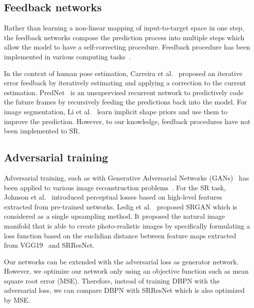 \documentclass[10pt,twocolumn,letterpaper]{article}
\begin{document}
\subsection{Feedback networks} 
Rather than learning a non-linear mapping of input-to-target space in one step, the feedback networks compose the prediction process into multiple steps which allow the model to have a self-correcting procedure. Feedback procedure has been implemented in various computing tasks~\cite{carreira2016human,ross2011learning,tu2010auto,li2016iterative,zamir2016feedback, shrivastava2016contextual,lotter2016deep}.

In the context of human pose estimation, Carreira et
al.~\cite{carreira2016human} proposed an iterative error feedback by
iteratively estimating and applying a correction to the current
estimation. PredNet~\cite{lotter2016deep} is an unsupervised recurrent
network to predictively code the future frames by recursively feeding
the predictions back into the model. For image segmentation, Li et
al.~\cite{li2016iterative} learn implicit shape priors and use them to
improve the prediction. However, to our knowledge, feedback procedures
have not been implemented to SR.

\subsection{Adversarial training}
Adversarial training, such as with Generative Adversarial Networks (GANs)~\cite{goodfellow2014generative} has been applied to various image reconstruction problems~\cite{ledig2016photo, sajjadi2016enhancenet, radford2015unsupervised, denton2015deep, johnson2016perceptual}. For the SR task, Johnson et al.~\cite{johnson2016perceptual} introduced perceptual losses based on high-level features extracted from pre-trained networks. Ledig et al.~\cite{ledig2016photo} proposed SRGAN which is considered as a single upsampling method. It proposed the natural image manifold that is able to create photo-realistic images by specifically formulating a loss function based on the euclidian distance between feature maps extracted from VGG19~\cite{simonyan2014very} and SRResNet. 

Our networks can be extended with the adversarial loss as generator network. However, we optimize our network only using an objective function such as mean square root error (MSE). Therefore, instead of training DBPN with the adversarial loss, we can compare DBPN with SRResNet which is also optimized by MSE.
\end{document}
